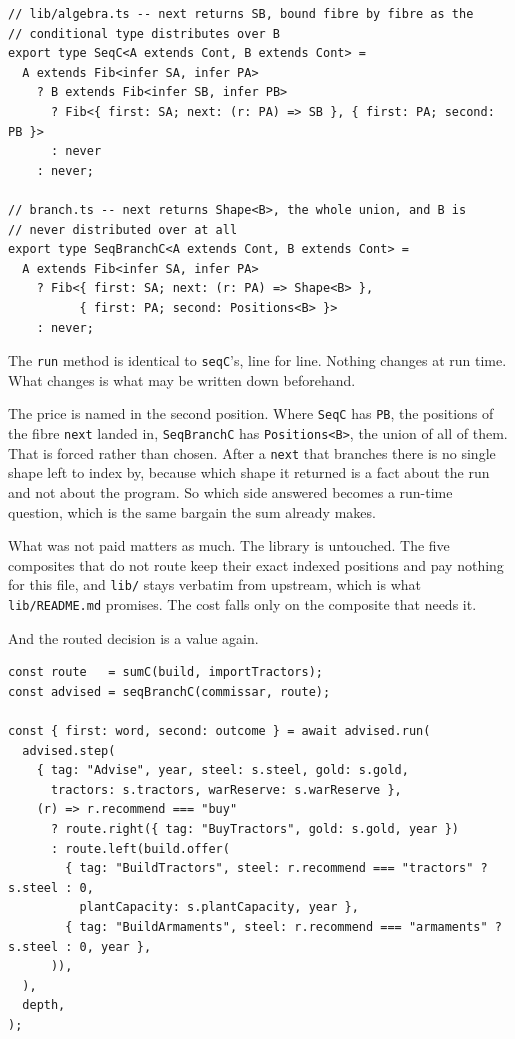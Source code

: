 \documentclass[11pt,a4paper]{article}
\begin{document}
\begin{lstlisting}[language=TS]
// lib/algebra.ts -- next returns SB, bound fibre by fibre as the
// conditional type distributes over B
export type SeqC<A extends Cont, B extends Cont> =
  A extends Fib<infer SA, infer PA>
    ? B extends Fib<infer SB, infer PB>
      ? Fib<{ first: SA; next: (r: PA) => SB }, { first: PA; second: PB }>
      : never
    : never;

// branch.ts -- next returns Shape<B>, the whole union, and B is
// never distributed over at all
export type SeqBranchC<A extends Cont, B extends Cont> =
  A extends Fib<infer SA, infer PA>
    ? Fib<{ first: SA; next: (r: PA) => Shape<B> },
          { first: PA; second: Positions<B> }>
    : never;
\end{lstlisting}

The \texttt{run} method is identical to \texttt{seqC}'s, line for line. Nothing changes at run
time. What changes is what may be written down beforehand.

The price is named in the second position. Where \texttt{SeqC} has \texttt{PB}, the positions of
the fibre \texttt{next} landed in, \texttt{SeqBranchC} has \texttt{Positions<B>}, the union of
all of them. That is forced rather than chosen. After a \texttt{next} that branches there is no
single shape left to index by, because which shape it returned is a fact about the run and not
about the program. So which side answered becomes a run-time question, which is the same bargain
the sum already makes.

What was not paid matters as much. The library is untouched. The five composites that do not
route keep their exact indexed positions and pay nothing for this file, and \texttt{lib/} stays
verbatim from upstream, which is what \texttt{lib/README.md} promises. The cost falls only on
the composite that needs it.

And the routed decision is a value again.

\begin{lstlisting}[language=TS]
const route   = sumC(build, importTractors);
const advised = seqBranchC(commissar, route);

const { first: word, second: outcome } = await advised.run(
  advised.step(
    { tag: "Advise", year, steel: s.steel, gold: s.gold,
      tractors: s.tractors, warReserve: s.warReserve },
    (r) => r.recommend === "buy"
      ? route.right({ tag: "BuyTractors", gold: s.gold, year })
      : route.left(build.offer(
        { tag: "BuildTractors", steel: r.recommend === "tractors" ? s.steel : 0,
          plantCapacity: s.plantCapacity, year },
        { tag: "BuildArmaments", steel: r.recommend === "armaments" ? s.steel : 0, year },
      )),
  ),
  depth,
);
\end{lstlisting}
\end{document}

